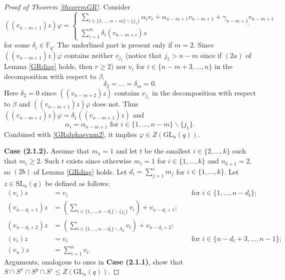 \documentclass[a4paper,reqno,11pt]{amsart}
\theoremstyle{definition}
\theoremstyle{remark}
\numberwithin{equation}{section}
\newcommand{\SL}{{\mathrm{SL}}}
\newcommand{\GL}{{\mathrm{GL}}}
\begin{document}
\begin{proof}[Proof of Theorem {\rm \ref{theoremGR}}]
Consider 
\begin{equation*}((v_{n-m+1})z) \varphi=
\begin{cases}
\underset{i \in \{1, \ldots, n-m\} \backslash \{j_1\}}{\sum} \alpha_i v_i + \alpha_{n-m+1} v_{n-m+1} +\underline{\gamma_{n-m+1} v_{n-m+1}}\\
\sum_{i=1}^m \delta_i (v_{n-m+i})z
\end{cases}
\end{equation*}
for some $\delta_i \in \mathbb{F}_q.$ The underlined part is present only if $m=2.$ Since $((v_{n-m+1})z) \varphi$ contains neither $v_{j_1}$ (notice that $j_1>n-m$ since if $(2a)$ of Lemma \ref{GRdiag} holds, then $r \ge 2$) nor $v_i$ for $i \in \{n-m+3, \ldots, n\}$ in the decomposition with respect to $\beta$, 
$$\delta_2 = \ldots = \delta_m =0.$$
Here $\delta_2=0$ since $((v_{n-m+2})z) $ contains $v_{j_1}$ in the decomposition with respect to $\beta$ and $((v_{n-m+1})z)\varphi$ does not.
Thus $((v_{n-m+1})z) \varphi= \delta_1 ((v_{n-m+1})z)$ and 
$$\alpha_i = \alpha_{n-m+1} \text{ for } i \in \{1, \ldots, n-m\} \backslash \{j_1\}.$$
Combined with \eqref{GRalphasvnm2}, it implies $\varphi \in Z(\GL_n(q)).$ 

\medskip

{\bf Case (2.1.2).} Assume that $m_1=1$ and let $t$ be the smallest $i \in \{2, \ldots, k\}$ such that $m_i\ge 2.$ Such $t$ exists since otherwise $m_i=1$ for $i \in \{1, \ldots, k\}$ and $n_{k+1}=2,$ so $(2b)$ of Lemma \ref{GRdiag} holds. Let $d_i=\sum_{j=1}^i m_j$ for $i \in \{1, \ldots, k\}$. Let $z \in \SL_n(q)$ be defined as follows:
\begin{equation}
\label{GRzdefq23mr}
\begin{aligned}
(v_i)z & =  v_i &&\text{ for } i \in \{1, \ldots, n-d_t\}; \\
(v_{n-d_t+1})z & =  \left(\underset{i \in \{1, \ldots, n-d_t\} \backslash \{j_1\}}{\sum} v_i \right) + v_{n-d_t+1};\\
(v_{n-d_t+2})z & =  \left(\underset{i \in \{1, \ldots, n-d_t\} \backslash \Lambda_2}{\sum} v_i \right)   + v_{n-d_t+2};\\
(v_i)z & =  v_i && \text{ for } i \in \{n-d_{t}+3, \ldots, n-1\};\\
(v_n)z & =  \sum_{i=1}^n v_i.
\end{aligned} 
\end{equation}
Arguments, analogous to  ones in {\bf Case (2.1.1)},  show that  $S \cap S^x \cap S^y \cap S^z \le Z(\GL_n(q))$.




\end{proof}
\end{document}
